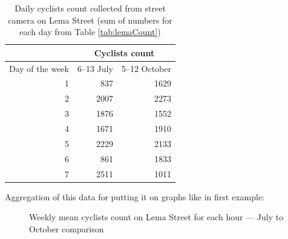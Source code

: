 \begin{table}[H]
    \centering
    \begin{tabular}{|r|r|r|}
\hline
\multicolumn{1}{|l|}{}                & \multicolumn{2}{c|}{Cyclists count}                                \\ \hline
\multicolumn{1}{|l|}{Day of the week} & \multicolumn{1}{l|}{6--13 July} & \multicolumn{1}{l|}{5--12 October} \\ \hline
1                                     & 837                            & 1629                              \\ \hline
2                                     & 2007                           & 2273                              \\ \hline
3                                     & 1876                           & 1552                              \\ \hline
4                                     & 1671                           & 1910                              \\ \hline
5                                     & 2229                           & 2133                              \\ \hline
6                                     & 861                            & 1833                              \\ \hline
7                                     & 2511                           & 1011                              \\ \hline
\end{tabular}
    \caption{Daily cyclists count collected from street camera on Lema Street (sum of numbers for each day from Table \ref{tab:lemaCount})}
    \label{tab:lemaSum}
\end{table}
Aggregation of this data for putting it on graphs like in first example:
\begin{figure}[H]
    \centering
    \caption{Weekly mean cyclists count on Lema Street for each hour --- July to October comparison}
    \label{fig:lemaCount}
\end{figure}
